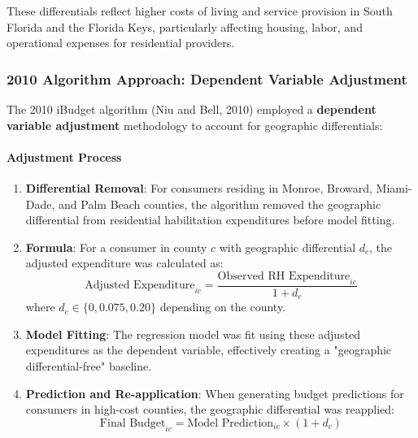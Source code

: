 These differentials reflect higher costs of living and service provision in South Florida and the Florida Keys, particularly affecting housing, labor, and operational expenses for residential providers.

\subsubsection{2010 Algorithm Approach: Dependent Variable Adjustment}

The 2010 iBudget algorithm (Niu and Bell, 2010) employed a \textbf{dependent variable adjustment} methodology to account for geographic differentials:

\paragraph{Adjustment Process}
\begin{enumerate}
    \item \textbf{Differential Removal}: For consumers residing in Monroe, Broward, Miami-Dade, and Palm Beach counties, the algorithm removed the geographic differential from residential habilitation expenditures before model fitting.
    
    \item \textbf{Formula}: For a consumer in county $c$ with geographic differential $d_c$, the adjusted expenditure was calculated as:
    \begin{equation}
    \text{Adjusted Expenditure}_{ic} = \frac{\text{Observed RH Expenditure}_{ic}}{1 + d_c}
    \label{eq:2010-adjustment}
    \end{equation}
    where $d_c \in \{0, 0.075, 0.20\}$ depending on the county.
    
    \item \textbf{Model Fitting}: The regression model was fit using these adjusted expenditures as the dependent variable, effectively creating a "geographic differential-free" baseline.
    
    \item \textbf{Prediction and Re-application}: When generating budget predictions for consumers in high-cost counties, the geographic differential was reapplied:
    \begin{equation}
    \text{Final Budget}_{ic} = \text{Model Prediction}_{ic} \times (1 + d_c)
    \label{eq:2010-reapplication}
    \end{equation}
\end{enumerate}


